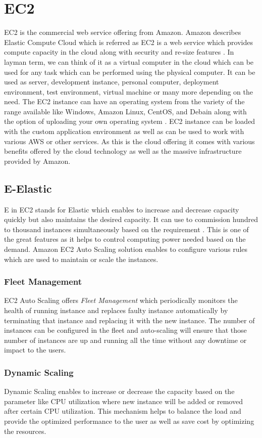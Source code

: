 \section{EC2}
EC2 is the commercial web service offering from Amazon. Amazon describes Elastic Compute Cloud which is referred as EC2 is a web service which provides compute capacity in the cloud along with security and re-size features \cite{www-aws-ec2}. In layman term, we can think of it as a virtual computer in the cloud which can be used for any task which can be performed using the physical computer. It can be used as server, development instance, personal computer, deployment environment, test environment, virtual machine or many more depending on the need. The EC2 instance can have an operating system from the variety of the range available like Windows, Amazon Linux, CentOS, and Debain along with the option of uploading your own operating system \cite{www-aws-ec2-details}. EC2 instance can be loaded with the custom application environment as well as can be used to work with various AWS or other services. As this is the cloud offering it comes with various benefits offered by the cloud technology as well as the massive infrastructure provided by Amazon.

\subsection{E-Elastic}
E in EC2 stands for Elastic which enables to increase and decrease capacity quickly but also maintains the desired capacity. It can use to commission hundred to thousand instances simultaneously based on the requirement \cite{www-aws-ec2}. This is one of the great features as it helps to control computing power needed based on the demand. 
Amazon EC2 Auto Scaling \cite{www-aws-ec2autoscaling} solution enables to configure various rules which are used to maintain or scale the instances. 
\subsubsection{Fleet Management}
EC2 Auto Scaling offers \emph{Fleet Management} which periodically monitors the health of running instance and replaces faulty instance automatically by terminating that instance and replacing it with the new instance. The number of instances can be configured in the fleet and auto-scaling will ensure that those number of instances are up and running all the time without any downtime or impact to the users.
\subsubsection{Dynamic Scaling}
Dynamic Scaling enables to increase or decrease the capacity based on the parameter like CPU utilization where new instance will be added or removed after certain CPU utilization. This mechanism helps to balance the load and provide the optimized performance to the user as well as save cost by optimizing the resources.

